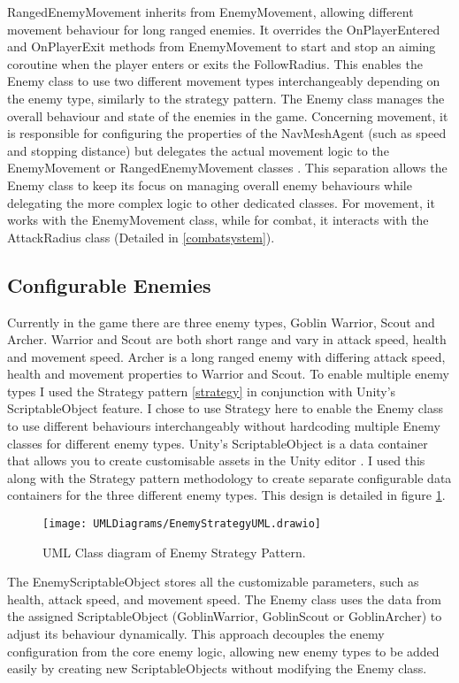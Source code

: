 \documentclass[]{final_report}
\begin{document}
\color{red} RangedEnemyMovement inherits from EnemyMovement, allowing different movement behaviour for long ranged enemies. It overrides the OnPlayerEntered and OnPlayerExit methods from EnemyMovement to start and stop an aiming coroutine when the player enters or exits the FollowRadius. This enables the Enemy class to use two different movement types interchangeably depending on the enemy type, similarly to the strategy pattern.  \color{black}
The Enemy class manages the overall behaviour and state of the enemies in the game. Concerning movement, it is responsible for configuring the properties of the NavMeshAgent (such as speed and stopping distance) but delegates the actual movement logic to the EnemyMovement \color{red} or RangedEnemyMovement classes \color{black}. This separation allows the Enemy class to keep its focus on managing overall enemy behaviours while delegating the more complex logic to other dedicated classes. For movement, it works with the EnemyMovement class, while for combat, it interacts with the AttackRadius class (Detailed in \ref{combatsystem}). 

\subsection{Configurable Enemies}
Currently in the game there are \color{red} three \color{black} enemy types, Goblin Warrior, Scout \color{red}and Archer. Warrior and Scout are both \color{black} short range and vary in attack speed, health and movement speed. \color{red} Archer is a long ranged enemy with differing attack speed, health and movement properties to Warrior and Scout. \color{black} To enable multiple enemy types I used the Strategy pattern \ref{strategy} in conjunction with Unity's ScriptableObject feature. I chose to use Strategy here to enable the Enemy class to use different behaviours interchangeably without hardcoding multiple Enemy classes for different enemy types. Unity's ScriptableObject is a data container that allows you to create customisable assets in the Unity editor \cite{unity2024_ScriptableObject}. I used this along with the Strategy pattern methodology to create separate configurable data containers for the \color{red}three \color{black} different enemy types. This design is detailed in figure \ref{fig:label_strategy}.
\begin{figure}[H]
    \centering
    \texttt{[image: UMLDiagrams/EnemyStrategyUML.drawio]}
    \caption{UML Class diagram of Enemy Strategy Pattern.}
    \label{fig:label_strategy}
\end{figure}
The EnemyScriptableObject stores all the customizable parameters, such as health, attack speed, and movement speed. The Enemy class uses the data from the assigned ScriptableObject (GoblinWarrior, GoblinScout \color{red}or GoblinArcher\color{black}) to adjust its behaviour dynamically. This approach decouples the enemy configuration from the core enemy logic, allowing new enemy types to be added easily by creating new ScriptableObjects without modifying the Enemy class. 
\end{document}

